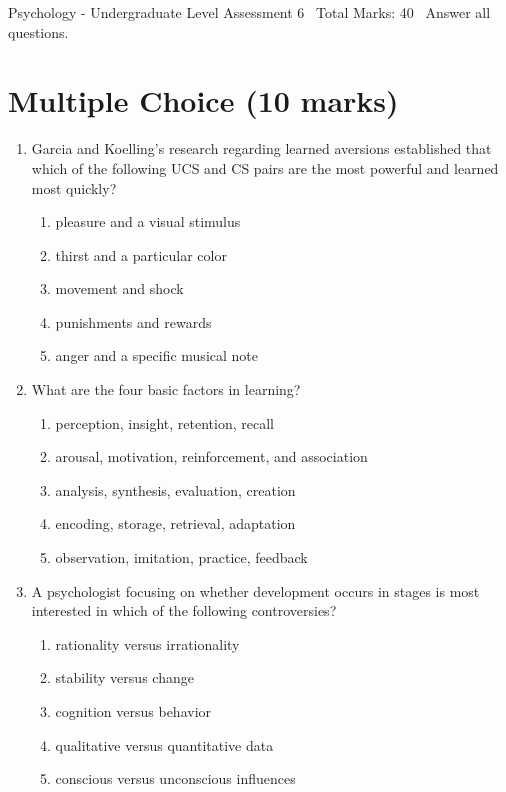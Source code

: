 \documentclass[12pt]{article}
\begin{document}
\begin{center}
Psychology - Undergraduate Level Assessment 6 \
Total Marks: 40 \
Answer all questions.
\end{center}

\section*{Multiple Choice (10 marks)}
\begin{enumerate}[label=\arabic*.]
\item Garcia and Koelling's research regarding learned aversions established that which of the following UCS and CS pairs are the most powerful and learned most quickly?
\begin{enumerate}[label=(\alph*)]
    \item pleasure and a visual stimulus
    \item thirst and a particular color
    \item movement and shock
    \item punishments and rewards
    \item anger and a specific musical note
\end{enumerate}
\item What are the four basic factors in learning?
\begin{enumerate}[label=(\alph*)]
    \item perception, insight, retention, recall
    \item arousal, motivation, reinforcement, and association
    \item analysis, synthesis, evaluation, creation
    \item encoding, storage, retrieval, adaptation
    \item observation, imitation, practice, feedback
\end{enumerate}
\item A psychologist focusing on whether development occurs in stages is most interested in which of the following controversies?
\begin{enumerate}[label=(\alph*)]
    \item rationality versus irrationality
    \item stability versus change
    \item cognition versus behavior
    \item qualitative versus quantitative data
    \item conscious versus unconscious influences
\end{enumerate}

\end{enumerate}
\end{document}
